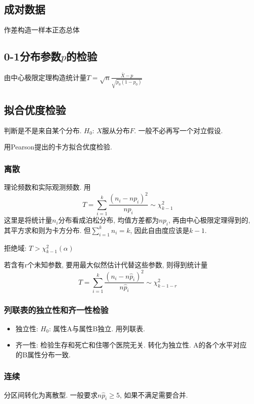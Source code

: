 \documentclass[UTF8]{article}
\begin{document}
\subsection{成对数据}
作差构造一样本正态总体
\subsection{0-1分布参数$p$的检验}
由中心极限定理构造统计量$T=\sqrt{n}\frac{\bar{X}-p}{\sqrt{p_0(1-p_0)}}$

\subsection{拟合优度检验}
判断是不是来自某个分布. $H_0$: $X$服从分布$F$. 一般不必再写一个对立假设.\par
用Pearson提出的卡方拟合优度检验.
\subsubsection{离散}
理论频数和实际观测频数. 用
$$T=\sum\limits_{i=1}^k\frac{(n_i-np_i)^2}{np_i}\sim\chi_{k-1}^2$$
这里是将统计量$n_i$分布看成泊松分布, 均值方差都为$np_i$, 再由中心极限定理得到的, 其平方求和则为卡方分布. 但$\sum\limits_{i=1}^k n_i=k$, 因此自由度应该是$k-1$.\par
拒绝域: $T>\chi_{k-1}^2(\alpha)$\par
若含有r个未知参数, 要用最大似然估计代替这些参数, 则得到统计量
$$T=\sum\limits_{i=1}^k\frac{(n_i-n\hat{p}_i)^2}{n\hat{p}_i}\sim \chi_{k-1-r}^2$$
\subsubsection{列联表的独立性和齐一性检验}
\begin{itemize}
\item 独立性: $H_0$: 属性A与属性B独立. 用列联表.
\item 齐一性: 检验生存和死亡和住哪个医院无关. 转化为独立性. A的各个水平对应的B属性分布一致.
\end{itemize}

\subsubsection{连续}
分区间转化为离散型. 一般要求$n\hat{p}_i\ge5$, 如果不满足需要合并.
\end{document}
